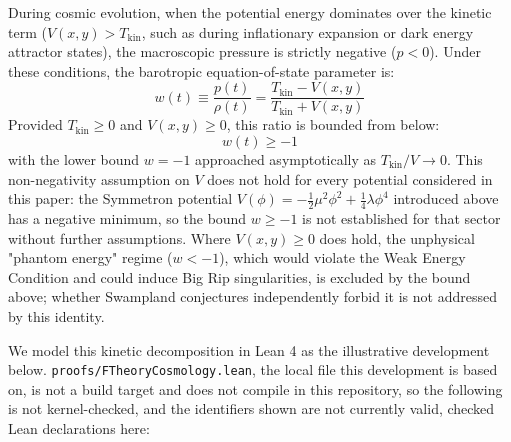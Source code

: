 \documentclass[11pt,a4paper]{article}
\begin{document}
During cosmic evolution, when the potential energy dominates over the kinetic term ($V(x, y) > T_{\text{kin}}$, such as during inflationary expansion or dark energy attractor states), the macroscopic pressure is strictly negative ($p < 0$). Under these conditions, the barotropic equation-of-state parameter is:
\begin{equation}
w(t) \equiv \frac{p(t)}{\rho(t)} = \frac{T_{\text{kin}} - V(x, y)}{T_{\text{kin}} + V(x, y)}
\end{equation}
Provided $T_{\text{kin}} \ge 0$ and $V(x, y) \ge 0$, this ratio is bounded from below:
\begin{equation}
w(t) \ge -1
\end{equation}
with the lower bound $w = -1$ approached asymptotically as $T_{\text{kin}} / V \to 0$. This non-negativity assumption on $V$ does not hold for every potential considered in this paper: the Symmetron potential $V(\phi) = -\frac{1}{2}\mu^2\phi^2 + \frac{1}{4}\lambda\phi^4$ introduced above has a negative minimum, so the bound $w \ge -1$ is not established for that sector without further assumptions. Where $V(x,y) \ge 0$ does hold, the unphysical "phantom energy" regime ($w < -1$), which would violate the Weak Energy Condition and could induce Big Rip singularities, is excluded by the bound above; whether Swampland conjectures independently forbid it is not addressed by this identity.

We model this kinetic decomposition in Lean 4 as the illustrative development below. \texttt{proofs/FTheoryCosmology.lean}, the local file this development is based on, is not a build target and does not compile in this repository, so the following is not kernel-checked, and the identifiers shown are not currently valid, checked Lean declarations here:
\end{document}
